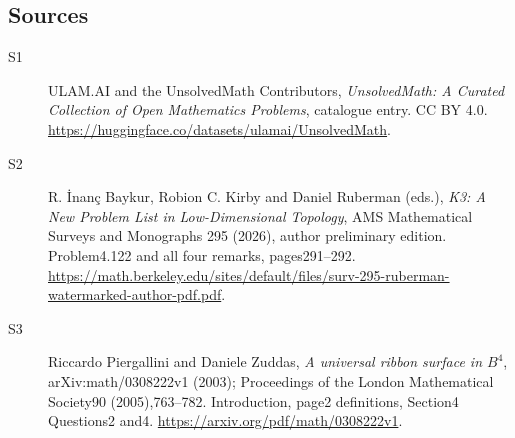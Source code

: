 \documentclass[11pt]{book}
\begin{document}
\subsection{Sources}
\begin{description}
\item[\hypertarget{source:statement:1}{S1}] ULAM.AI and the UnsolvedMath Contributors, \emph{UnsolvedMath: A Curated Collection of Open Mathematics Problems}, catalogue entry. CC BY 4.0. \url{https://huggingface.co/datasets/ulamai/UnsolvedMath}.
\item[\hypertarget{source:statement:2}{S2}] R. İnanç Baykur, Robion C. Kirby and Daniel Ruberman (eds.), \emph{K3: A New Problem List in Low-Dimensional Topology}, AMS Mathematical Surveys and Monographs 295 (2026), author preliminary edition. Problem4.122 and all four remarks, pages291--292. \url{https://math.berkeley.edu/sites/default/files/surv-295-ruberman-watermarked-author-pdf.pdf}.
\item[\hypertarget{source:statement:3}{S3}] Riccardo Piergallini and Daniele Zuddas, \emph{A universal ribbon surface in $B^4$}, arXiv:math/0308222v1 (2003); Proceedings of the London Mathematical Society90 (2005),763--782. Introduction, page2 definitions, Section4 Questions2 and4. \url{https://arxiv.org/pdf/math/0308222v1}.
\end{description}
\label{end:statement}
\end{document}
